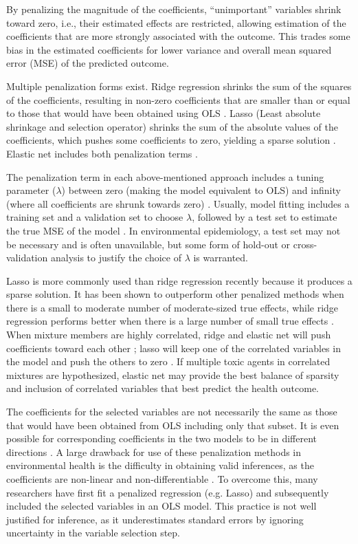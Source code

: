 By penalizing the magnitude of the coefficients, ``unimportant'' variables shrink toward zero, i.e., their estimated effects are restricted, allowing estimation of the coefficients that are more strongly associated with the outcome. This trades some bias in the estimated coefficients for lower variance and overall mean squared error (MSE) of the predicted outcome.

Multiple penalization forms exist. Ridge regression shrinks the sum of the squares of the coefficients, resulting in non-zero coefficients that are smaller than or equal to those that would have been obtained using OLS \cite{hoerl1970ridge}. Lasso (Least absolute shrinkage and selection operator) shrinks the sum of the absolute values of the coefficients, which pushes some coefficients to zero, yielding a sparse solution \cite{tibshirani96}. Elastic net includes both penalization terms \cite{zou05}.

The penalization term in each above-mentioned approach includes a tuning parameter ($\lambda$) between zero (making the model equivalent to OLS) and infinity (where all coefficients are shrunk towards zero) \cite{friedman2001elements, ISLR}. Usually, model fitting includes a training set and a validation set to choose $\lambda$, followed by a test set to estimate the true MSE of the model \cite{daume2012course}. In environmental epidemiology, a test set may not be necessary and is often unavailable, but some form of hold-out or cross-validation analysis to justify the choice of $\lambda$ is warranted.

Lasso is more commonly used than ridge regression recently because it produces a sparse solution. It has been shown to outperform other penalized methods when there is a small to moderate number of moderate-sized true effects, while ridge regression performs better when there is a large number of small true effects \cite{tibshirani96}. When mixture members are highly correlated, ridge and elastic net will push coefficients toward each other \cite{zou05, hoerl1970ridge}; lasso will keep one of the correlated variables in the model and push the others to zero \cite{tibshirani96}. If multiple toxic agents in correlated mixtures are hypothesized, elastic net may provide the best balance of sparsity and inclusion of correlated variables that best predict the health outcome.

The coefficients for the selected variables are not necessarily the same as those that would have been obtained from OLS including only that subset. It is even possible for corresponding coefficients in the two models to be in different directions \cite{tibshirani96}. A large drawback for use of these penalization methods in environmental health is the difficulty in obtaining valid inferences, as the coefficients are non-linear and non-differentiable \cite{tibshirani96}. To overcome this, many researchers have first fit a penalized regression (e.g. Lasso) and subsequently included the selected variables in an OLS model. This practice is not well justified for inference, as it underestimates standard errors by ignoring uncertainty in the variable selection step.

